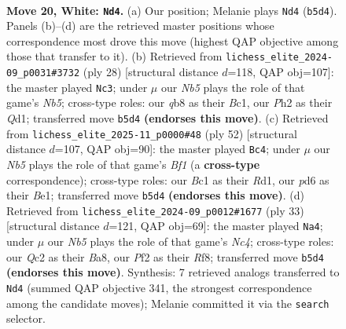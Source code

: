 \documentclass[11pt]{article}
\begin{document}
\clearpage

\begin{figure}[p]\centering
\begin{subfigure}{0.46\textwidth}\centering
\resizebox{\linewidth}{!}{%
\newchessgame
\chessboard[
  setfen={rq6/1bp2kpp/1b1p1n2/1N6/pP2P1n1/2P5/P1Q2PPP/1RB1RK2 w - - 1 20},
  showmover=false,
  pgfstyle=straightmove, color=movearrow, markmove={b5-d4}
]}
\caption{}
\end{subfigure}\hfill
\begin{subfigure}{0.46\textwidth}\centering
\resizebox{\linewidth}{!}{%
\newchessgame
\chessboard[
  setfen={qr4k1/1bp1bppp/3p1n2/1N2p3/4P3/1P1P1N2/1P3PPP/2BQR1K1 w - - 1 15},
  showmover=false,
  pgfstyle=straightmove, color=movearrow, markmove={b5-c3}
]}
\caption{}
\end{subfigure}
\\[4pt]
\begin{subfigure}{0.46\textwidth}\centering
\resizebox{\linewidth}{!}{%
\newchessgame
\chessboard[
  setfen={1r4k1/1rnnqpb1/p2p2p1/2pP3p/N7/4P2P/RPQ2PP1/3RBBK1 w - - 12 27},
  showmover=false,
  pgfstyle=straightmove, color=movearrow, markmove={f1-c4}
]}
\caption{}
\end{subfigure}\hfill
\begin{subfigure}{0.46\textwidth}\centering
\resizebox{\linewidth}{!}{%
\newchessgame
\chessboard[
  setfen={b4rk1/2pqbppp/3p4/1pnPp3/8/3P1N1P/BPPB1PP1/3QR1K1 b - - 2 17},
  showmover=false,
  pgfstyle=straightmove, color=movearrow, markmove={c5-a4}
]}
\caption{}
\end{subfigure}
\caption{\textbf{Move 20, White: \texttt{Nd4}.} (a) Our position; Melanie plays \texttt{Nd4} (\texttt{b5d4}). Panels (b)--(d) are the retrieved master positions whose correspondence most drove this move (highest QAP objective among those that transfer to it). (b) Retrieved from \texttt{lichess\_elite\_2024-09\_p0031\#3732} (ply 28) [structural distance $d$=118, QAP obj=107]: the master played \texttt{Nc3}; under $\mu$ our \emph{Nb5} plays the role of that game's \emph{Nb5}; cross-type roles: our \emph{q}b8 as their \emph{B}c1, our \emph{P}h2 as their \emph{Q}d1; transferred move \texttt{b5d4} \textbf{(endorses this move)}. (c) Retrieved from \texttt{lichess\_elite\_2025-11\_p0000\#48} (ply 52) [structural distance $d$=107, QAP obj=90]: the master played \texttt{Bc4}; under $\mu$ our \emph{Nb5} plays the role of that game's \emph{Bf1} (a \textbf{cross-type} correspondence); cross-type roles: our \emph{B}c1 as their \emph{R}d1, our \emph{p}d6 as their \emph{B}e1; transferred move \texttt{b5d4} \textbf{(endorses this move)}. (d) Retrieved from \texttt{lichess\_elite\_2024-09\_p0012\#1677} (ply 33) [structural distance $d$=121, QAP obj=69]: the master played \texttt{Na4}; under $\mu$ our \emph{Nb5} plays the role of that game's \emph{Nc4}; cross-type roles: our \emph{Q}c2 as their \emph{B}a8, our \emph{P}f2 as their \emph{R}f8; transferred move \texttt{b5d4} \textbf{(endorses this move)}. Synthesis: 7 retrieved analogs transferred to \texttt{Nd4} (summed QAP objective 341, the strongest correspondence among the candidate moves); Melanie committed it via the \texttt{search} selector.}
\label{fig:thought-m38}
\end{figure}
\end{document}
